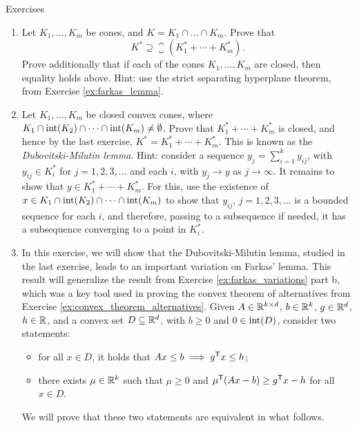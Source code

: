 \begin{xcb}{Exercises}
\begin{enumerate}[label=\thechapter.\arabic*]
\item Let $K_1,\dots,K_m$ be cones, and $K = K_1 \cap \dots \cap K_m$. Prove
  that 
  \[
  K^* \supseteq \closure(K_1^* + \cdots + K_m^*).
  \]
  Prove additionally that if each of the cones $K_1,\dots,K_m$ are closed, then
  equality holds above. Hint: use the strict separating hyperplane theorem, from
  Exercise \ref{ex:farkas_lemma}.

\item \label{ex:dubovitski_milutin_lemma}
  Let $K_1,\dots,K_m$ be closed convex cones, where $K_1 \cap \operatorname{int}(K_2) 
  \cap \cdots \cap \operatorname{int}(K_m) \not= \emptyset$. Prove that $K_1 ^* + \cdots
  + K_m^*$ is closed, and hence by the last exercise, $K^* = K_1^* + \cdots
  + K_m^*$. This is known as the \emph{Dubovitski-Milutin lemma}. Hint: consider
  a sequence $y_j = \sum_{i=1}^k y_{ij}$, with $y_{ij} \in K_i^*$ for $j =
  1,2,3,\dots$ and each $i$, with $y_j \to y$ as $j \to \infty$. It remains to
  show that $y \in K_1^* + \cdots + K_m^*$. For this, use the existence of $x
  \in K_1 \cap \operatorname{int}(K_2) \cap \cdots \cap \operatorname{int}(K_m)$ to show that
  $y_{ij}$, $j = 1,2,3,\dots$ is a bounded sequence for each $i$, and therefore, 
  passing to a subsequence if needed, it has a subsequence converging to a point
  in $K_i^*$. 

\item \label{ex:farkas_variations_conic} 
  In this exercise, we will show that the Dubovitski-Milutin lemma, studied in
  the last exercise, leads to an important variation on Farkas' lemma. This
  result will generalize the result from Exercise \ref{ex:farkas_variations}
  part b, which was a key tool used in proving the convex theorem of
  alternatives from Exercise \ref{ex:convex_theorem_alternatives}. Given $A \in
  \mathbb{R}^{k \times d}$, $b \in \mathbb{R}^k$, $g \in \mathbb{R}^d$, $h \in \mathbb{R}$, and a convex set $D
  \subseteq \mathbb{R}^d$, with $b \geq 0$ and $0 \in \operatorname{int}(D)$, consider two
  statements:        
  \begin{itemize}
  \item for all $x \in D$, it holds that $Ax \leq b \implies g^{\mathsf{T}} x \leq h$;  
  \item there exists $\mu \in \mathbb{R}^k$ such that $\mu \geq 0$ and $\mu^{\mathsf{T}} (Ax - b) 
    \geq g^{\mathsf{T}} x - h$ for all $x \in D$.
  \end{itemize}
  We will prove that these two statements are equivalent in what follows.
  

\end{enumerate}
\end{xcb}
